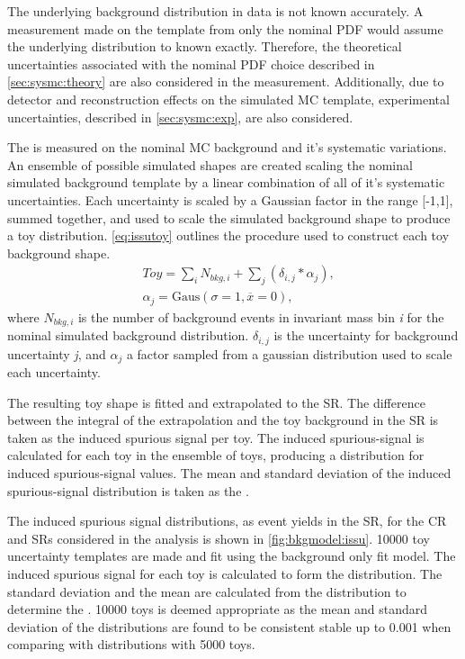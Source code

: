 The underlying background distribution in data is not known accurately. A \ISSU measurement made on the template from only the nominal PDF would assume the underlying distribution to known exactly. Therefore, the theoretical uncertainties associated with the nominal PDF choice described in \cref{sec:sysmc:theory} are also considered in the \ISSU measurement. Additionally, due to detector and reconstruction effects on the simulated MC template, experimental uncertainties, described in \cref{sec:sysmc:exp}, are also considered. 

The \ISSU is measured on the nominal MC background and it's systematic variations. An ensemble of possible simulated shapes are created scaling the nominal simulated background template by a linear combination of all of it's systematic uncertainties. Each uncertainty is scaled by a Gaussian factor in the range [-1,1], summed together, and used to scale the simulated background shape to produce a toy distribution. \cref{eq:issutoy} outlines the procedure used to construct each toy background shape. 
\begin{equation}
    \label{eq:issutoy}
    \begin{aligned}
        & Toy = \sum_{i} N_{bkg,i} + \sum_{j} \left(\delta_{i,j} * \alpha_{j}\right), \\
        & \alpha_j = \mathrm{Gaus}(\sigma=1,\overline{x}=0),
    \end{aligned}
\end{equation}
where $N_{bkg,i}$ is the number of background events in invariant mass bin \emph{i} for the nominal simulated background distribution. $\delta_{i,j}$ is the uncertainty for background uncertainty \emph{j}, and $\alpha_j$ a factor sampled from a gaussian distribution used to scale each uncertainty.

The resulting toy shape is fitted and extrapolated to the SR. The difference between the integral of the extrapolation and the toy background in the SR is taken as the induced spurious signal per toy. The induced spurious-signal is calculated for each toy in the ensemble of toys, producing a distribution for induced spurious-signal values. The mean and standard deviation of the induced spurious-signal distribution is taken as the \ISSU. 

The induced spurious signal distributions, as event yields in the SR, for the CR and SRs considered in the analysis is shown in \cref{fig:bkgmodel:issu}. 10000 toy uncertainty templates are made and fit using the background only fit model. The induced spurious signal for each toy is calculated to form the distribution. The standard deviation and the mean are calculated from the distribution to determine the \ISSU. 10000 toys is deemed appropriate as the mean and standard deviation of the distributions are found to be consistent stable up to 0.001 when comparing with distributions with 5000 toys.


